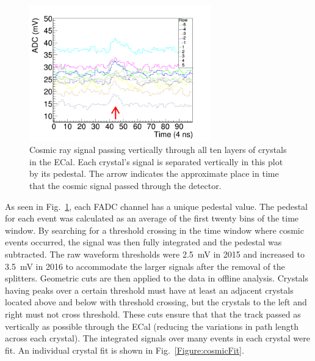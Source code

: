 \begin{figure}[H]
  \centering
      \includegraphics[width=0.7\textwidth]{pics/performance/cosmicSignal.png}
  \caption[Real cosmic ray signal in raw FADC waveform passing vertically through ECal]{Cosmic ray signal passing vertically through all ten layers of crystals in the ECal. Each crystal's signal is separated vertically in this plot by its pedestal. The arrow indicates the approximate place in time that the cosmic signal passed through the detector.}
  \label{Figure:cosmicSig}
\end{figure}

As seen in Fig.~\ref{Figure:cosmicSig}, each FADC channel has a unique pedestal value. The pedestal for each event was calculated as an average of the first twenty bins of the time window. By searching for a threshold crossing in the time window where cosmic events occurred, the signal was then fully integrated and the pedestal was subtracted. The raw waveform thresholds were 2.5~mV in 2015 and increased to 3.5~mV in 2016 to accommodate the larger signals after the removal of the splitters. Geometric cuts are then applied to the data in offline analysis. Crystals having peaks over a certain threshold must have at least an adjacent crystals located above and below with threshold crossing, but the crystals to the left and right must not cross threshold. These cuts ensure that that the track passed as vertically as possible through the ECal (reducing the variations in path length across each crystal). The integrated signals over many events in each crystal were fit. An individual crystal fit is shown in Fig.~\ref{Figure:cosmicFit}.


